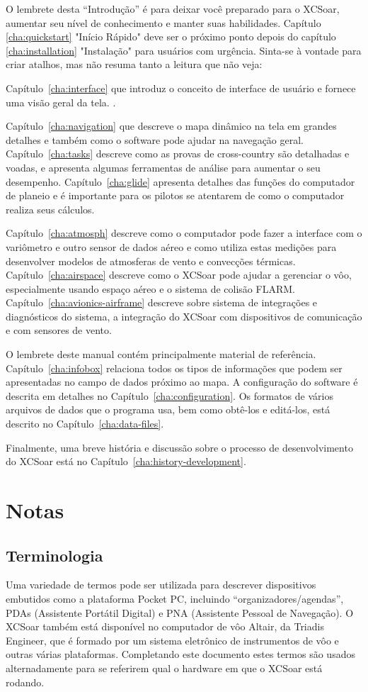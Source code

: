 O lembrete desta “Introdução” é para deixar você preparado para o XCSoar, aumentar seu nível de conhecimento e manter suas habilidades.   
Capítulo \ref{cha:quickstart} "Início Rápido" deve ser o próximo ponto depois do capítulo 
\ref{cha:installation} "Instalação" para usuários com urgência. Sinta-se à vontade para criar atalhos, mas não resuma tanto a leitura que não veja:

Capítulo~\ref{cha:interface} que introduz o conceito de interface de usuário e fornece uma visão geral da tela. .

Capítulo~\ref{cha:navigation} que descreve o mapa dinâmico na tela em grandes detalhes e também como o software pode ajudar na navegação geral.  Capítulo~\ref{cha:tasks} descreve como as provas de cross-country são detalhadas e voadas, e apresenta algumas ferramentas de análise para aumentar o seu desempenho.
Capítulo~\ref{cha:glide} apresenta detalhes das funções do computador de planeio e é importante para os pilotos se atentarem de como o computador realiza seus cálculos.

Capítulo~\ref{cha:atmosph} descreve como o computador pode fazer a interface com o variômetro e outro sensor de dados aéreo e como utiliza estas medições para desenvolver modelos de atmosferas de vento e convecções térmicas.  
Capítulo~\ref{cha:airspace} descreve como o XCSoar pode ajudar a gerenciar o vôo, especialmente usando espaço aéreo e o sistema de colisão FLARM.  Capítulo~\ref{cha:avionics-airframe} descreve sobre sistema de integrações e diagnósticos do sistema, a integração do XCSoar com dispositivos de comunicação e com sensores de vento.

O lembrete deste manual contém principalmente material de referência.  
Capítulo~\ref{cha:infobox} relaciona todos os tipos de informações que podem ser apresentadas no campo de dados próximo ao mapa.  A configuração do software é descrita em detalhes no
Capítulo~\ref{cha:configuration}.  Os formatos de vários arquivos de dados que o programa usa, bem como obtê-los e editá-los, está descrito no Capítulo~\ref{cha:data-files}.

Finalmente, uma breve história e discussão sobre o processo de desenvolvimento do XCSoar está no Capítulo~\ref{cha:history-development}.

\section{Notas}

\subsection*{Terminologia}
Uma variedade de termos pode ser utilizada para descrever dispositivos embutidos como a plataforma Pocket PC, incluindo “organizadores/agendas”,   PDAs (Assistente Portátil Digital) e PNA (Assistente Pessoal de Navegação).  O XCSoar também está disponível no computador de vôo Altair, da Triadis Engineer, que é formado por um sistema eletrônico de instrumentos de vôo e outras várias plataformas.  
Completando este documento estes termos são usados alternadamente para se referirem qual o hardware em que o XCSoar está rodando.


